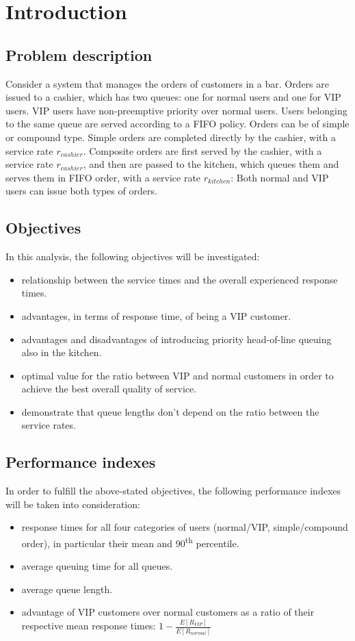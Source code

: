 \section{Introduction}

\subsection{Problem description}
Consider a system that manages the orders of customers in a bar. Orders are issued to a cashier, which
has two queues: one for normal users and one for VIP users. VIP users have non-preemptive priority
over normal users. Users belonging to the same queue are served according to a FIFO policy.
Orders can be of simple or compound type. Simple orders are completed directly by the cashier, with
a service rate $r_{cashier}$. Composite orders are first served by the cashier, with a service rate $r_{cashier}$, and
then are passed to the kitchen, which queues them and serves them in FIFO order, with a service rate
$r_{kitchen}$: Both normal and VIP users can issue both types of orders.

\subsection{Objectives}
In this analysis, the following objectives will be investigated:
\begin{itemize}
    \item relationship between the service times and the overall experienced
        response times. 
    \item advantages, in terms of response time, of being a VIP customer.
    \item advantages and disadvantages of introducing priority head-of-line queuing
        also in the kitchen.
    \item optimal value for the ratio between VIP and normal customers in order to achieve the best overall quality of service.
    \item demonstrate that queue lengths don't depend on the ratio between the service rates.
\end{itemize}

\subsection{Performance indexes}
In order to fulfill the above-stated objectives, the following performance 
indexes will be taken into consideration:
\begin{itemize}
    \item response times for all four categories of users (normal/VIP, 
    simple/compound order), in particular their mean and 90\textsuperscript{th} 
    percentile.
    \item average queuing time for all queues.
    \item average queue length.
    \item advantage of VIP customers over normal customers as a ratio of their respective mean response times: $1-{\frac{E[R_{VIP}]}{E[R_{normal}]}}$
\end{itemize}


